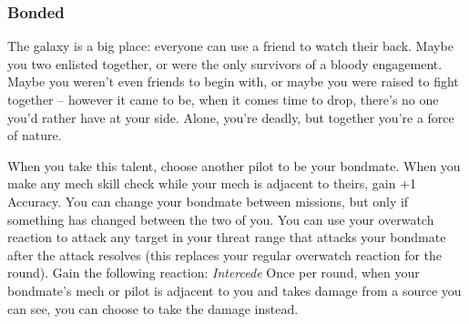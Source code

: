 \subsubsection{Bonded}



\begin{talent}
{The galaxy is a big place: everyone can use a friend to watch their back. Maybe you two enlisted together, or were the only survivors of a bloody engagement. Maybe you weren't even friends to begin with, or maybe you were raised to fight together -- however it came to be, when it comes time to drop, there's no one you'd rather have at your side. Alone, you're deadly, but together you're a force of nature.}

When you take this talent, choose another pilot to be your bondmate. When you make any mech skill check while your mech is adjacent to theirs, gain +1 Accuracy. You can change your bondmate between missions, but only if something has changed between the two of you.
You can use your overwatch reaction to attack any target in your threat range that attacks your bondmate after the attack resolves (this replaces your regular overwatch reaction for the round).
Gain the following reaction:
\textit{Intercede} 
\Reaction
Once per round, when your bondmate's mech or pilot is adjacent to you and takes damage from a source you can see, you can choose to take the damage instead.
\end{talent}